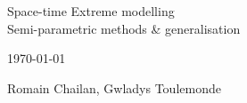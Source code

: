 \documentclass[11pt]{article}
\begin{document}

\begin{center}
{\Large
	{\sc  Space-time Extreme modelling}\\
}
{\sc  Semi-parametric methods \& generalisation}
\bigskip

\today

\bigskip

\noindent  Romain Chailan, Gwladys Toulemonde
\bigskip
\end{center}






\end{document}
